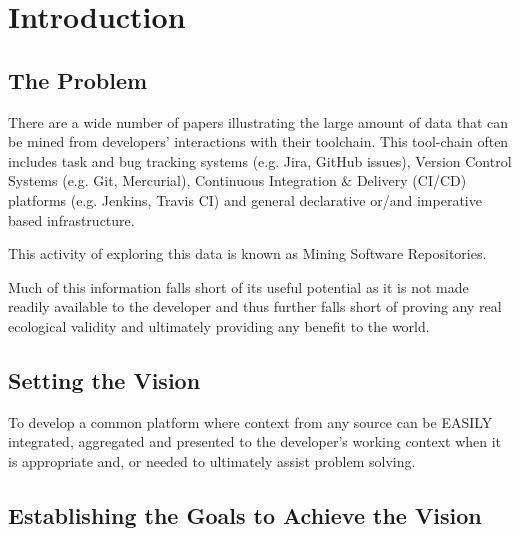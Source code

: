 \chapter{Introduction}

\section{The Problem}

\normalfont There are a wide number of papers illustrating the large amount of data that can be mined from developers' interactions with their toolchain. This tool-chain often includes task and bug tracking systems (e.g. Jira, GitHub issues), Version Control Systems (e.g. Git, Mercurial), Continuous Integration \& Delivery (CI/CD) platforms (e.g. Jenkins, Travis CI) and general declarative or/and imperative based infrastructure.

This activity of exploring this data is known as Mining Software Repositories.

Much of this information falls short of its useful potential as it is not made readily available to the developer and thus further falls short of proving any real ecological validity and ultimately providing any benefit to the world.

\section{Setting the Vision}

To develop a common platform where context from any source can be EASILY integrated, aggregated and presented to the developer's working context when it is appropriate and, or needed to ultimately assist problem solving. 

\section{Establishing the Goals to Achieve the Vision}

